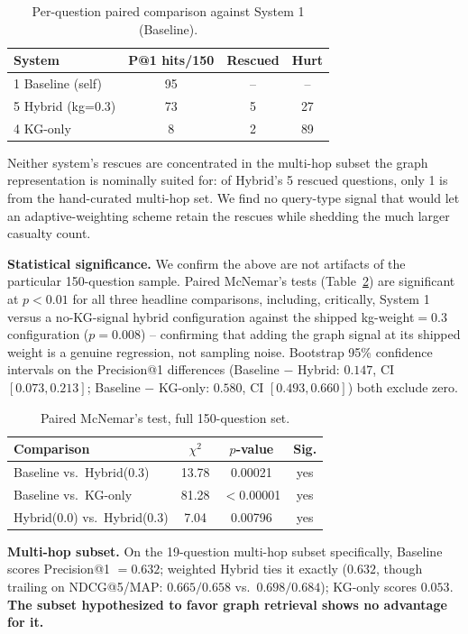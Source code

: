 \documentclass[sigconf,anonymous,review]{acmart}
\begin{document}
\begin{table}[t]
\caption{Per-question paired comparison against System 1 (Baseline).}
\label{tab:rescue}
\begin{tabular}{lccc}
\toprule
System & P@1 hits/150 & Rescued & Hurt \\
\midrule
1 Baseline (self)    & 95 & -- & -- \\
5 Hybrid (kg=0.3)     & 73 & 5  & 27 \\
4 KG-only             & 8  & 2  & 89 \\
\bottomrule
\end{tabular}
\end{table}

Neither system's rescues are concentrated in the multi-hop subset the graph representation is nominally suited for: of Hybrid's 5 rescued questions, only 1 is from the hand-curated multi-hop set. We find no query-type signal that would let an adaptive-weighting scheme retain the rescues while shedding the much larger casualty count.

\textbf{Statistical significance.} We confirm the above are not artifacts of the particular 150-question sample. Paired McNemar's tests (Table~\ref{tab:mcnemar}) are significant at $p < 0.01$ for all three headline comparisons, including, critically, System 1 versus a no-KG-signal hybrid configuration against the shipped kg-weight$=0.3$ configuration ($p = 0.008$) -- confirming that adding the graph signal at its shipped weight is a genuine regression, not sampling noise. Bootstrap 95\% confidence intervals on the Precision@1 differences (Baseline $-$ Hybrid: $0.147$, CI $[0.073, 0.213]$; Baseline $-$ KG-only: $0.580$, CI $[0.493, 0.660]$) both exclude zero.

\begin{table}[t]
\caption{Paired McNemar's test, full 150-question set.}
\label{tab:mcnemar}
\begin{tabular}{lccc}
\toprule
Comparison & $\chi^2$ & $p$-value & Sig. \\
\midrule
Baseline vs.\ Hybrid(0.3)      & 13.78 & 0.00021  & yes \\
Baseline vs.\ KG-only          & 81.28 & $<$0.00001 & yes \\
Hybrid(0.0) vs.\ Hybrid(0.3)   & 7.04  & 0.00796  & yes \\
\bottomrule
\end{tabular}
\end{table}

\textbf{Multi-hop subset.} On the 19-question multi-hop subset specifically, Baseline scores Precision@1 $=0.632$; weighted Hybrid ties it exactly ($0.632$, though trailing on NDCG@5/MAP: $0.665/0.658$ vs.\ $0.698/0.684$); KG-only scores $0.053$. \textbf{The subset hypothesized to favor graph retrieval shows no advantage for it.}
\end{document}
